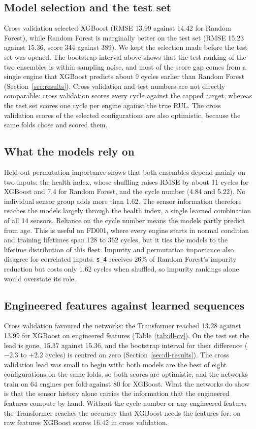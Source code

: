 \subsection{Model selection and the test set}
Cross validation selected XGBoost (RMSE 13.99 against 14.42 for Random
Forest), while Random Forest is marginally better on the test set (RMSE
15.23 against 15.36, score 344 against 389). We kept the selection made
before the test set was opened. The bootstrap interval above shows that the
test ranking of the two ensembles is within sampling noise, and most of the
score gap comes from a single engine that XGBoost predicts about 9 cycles
earlier than Random Forest (Section~\ref{sec:results}). Cross validation and test numbers are not
directly comparable: cross validation scores every cycle against the
capped target, whereas the test set scores one cycle per engine against
the true RUL. The cross validation scores of the selected configurations
are also optimistic, because the same folds chose and scored them.

\subsection{What the models rely on}
Held-out permutation importance shows that both ensembles depend mainly on
two inputs: the health index, whose shuffling raises RMSE by about 11
cycles for XGBoost and 7.4 for Random Forest, and the cycle number (4.84
and 5.22). No individual sensor group adds more than 1.62. The sensor
information therefore reaches the models largely through the health index,
a single learned combination of all 14 sensors. Reliance on the cycle
number means the models partly predict from age. This is useful on FD001,
where every engine starts in normal condition and training lifetimes span
128 to 362 cycles, but it ties the models to the lifetime distribution of
this fleet. Impurity and permutation importance also disagree for
correlated inputs: \texttt{s\_4} receives 26\% of Random Forest's impurity
reduction but costs only 1.62 cycles when shuffled, so impurity rankings
alone would overstate its role.

\subsection{Engineered features against learned sequences}
Cross validation favoured the networks: the Transformer reached 13.28
against 13.99 for XGBoost on engineered features
(Table~\ref{tab:dl-cv}). On the test set the lead is gone, 15.37 against
15.36, and the bootstrap interval for their difference ($-2.3$ to $+2.2$
cycles) is centred on zero (Section~\ref{sec:dl-results}). The cross
validation lead was small to begin with: both models are the best of eight
configurations on the same folds, so both scores are optimistic, and the
networks train on 64 engines per fold against 80 for XGBoost. What the
networks do show is that the sensor history alone carries the information
that the engineered features compute by hand. Without the cycle number or
any engineered feature, the Transformer reaches the accuracy that XGBoost
needs the features for; on raw features XGBoost scores 16.42 in cross
validation.

